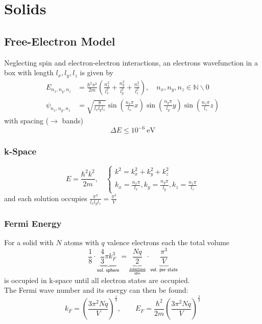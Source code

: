 \section{Solids}
\subsection{Free-Electron Model}
Neglecting spin and electron-electron interactions, an electrons wavefunction in a box with length $l_x,l_y,l_z$ is given by
\noindent\begin{align*}
    E_{n_x,n_y,n_z}    & = \frac{\hbar^2\pi^2}{2m}\left(\frac{n_x^2}{l_x^2}+\frac{n_y^2}{l_y^2}+\frac{n_z^2}{l_z^2}\right),\quad n_x,n_y,n_z \in \mathbb{N}\backslash 0 \\
    \psi_{n_x,n_y,n_z} & = \sqrt{\frac{8}{l_x l_y l_z}} \sin\left(\frac{n_x\pi}{l_x}x\right) \sin\left(\frac{n_y\pi}{l_y}y\right) \sin\left(\frac{n_z\pi}{l_z}z\right)
\end{align*}
with spacing ($\to$ bands)
\noindent\begin{equation*}
    \Delta E \leq 10^{-6} ~\mathrm{eV}
\end{equation*}

\subsubsection{k-Space}
\noindent\begin{equation*}
    E = \frac{\hbar^2k^2}{2m}, \quad \begin{cases}
        k^2 = k_x^2+k_y^2+k_z^2 \\
        k_x = \frac{n_x\pi}{l_x}, k_y = \frac{n_y\pi}{l_y}, k_z = \frac{n_z\pi}{l_z}
    \end{cases}
\end{equation*}
and each solution occupies $\frac{\pi^3}{l_x l_y l_z}=\frac{\pi^3}{V}$

\subsubsection{Fermi Energy}
\newpar{}
For a solid with $N$ atoms with $q$ valence electrons each the total volume
\noindent\begin{equation*}
    \frac{1}{8}\cdot\underbrace{\frac{4}{3}\pi k_F^3}_{\textsf{vol. sphere}} = \underbrace{\frac{Nq}{2}}_{\frac{\textsf{\# electrons}}{\mathsf{spin}}}\cdot \underbrace{\frac{\pi^3}{V}}_{\textsf{vol. per state}}
\end{equation*}
is occupied in k-space until all electron states are occupied.\\
The Fermi wave number and its energy can then be found:
\noindent\begin{equation*}
    k_F  = {\left(\frac{3\pi^2 N q}{V}\right)}^{\frac{1}{3}}, \qquad
    E_F  = \frac{\hbar^2}{2m}{\left(\frac{3\pi^2 N q}{V}\right)}^{\frac{2}{3}}
\end{equation*}

